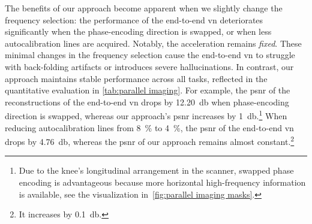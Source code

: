 The benefits of our approach become apparent when we slightly change the frequency selection:
the performance of the end-to-end \gls{vn} deteriorates significantly when the phase-encoding direction is swapped, or when less autocalibration lines are acquired.
Notably, the acceleration remains \emph{fixed}.
These minimal changes in the frequency selection cause the end-to-end \gls{vn} to struggle with back-folding artifacts or introduces severe hallucinations.
In contrast, our approach maintains stable performance across all tasks, reflected in the quantitative evaluation in \cref{tab:parallel imaging}.
For example, the \gls{psnr} of the reconstructions of the end-to-end \gls{vn} drops by \qty{12.20}{\decibel} when phase-encoding direction is swapped, whereas our approach's \gls{psnr} increases by \qty{1}{\decibel}.\footnote{%
	Due to the knee's longitudinal arrangement in the scanner, swapped phase encoding is advantageous because more horizontal high-frequency information is available, see the visualization in~\cref{fig:parallel imaging masks}.
}
When reducing autocalibration lines from \qty{8}{\percent} to \qty{4}{\percent}, the \gls{psnr} of the end-to-end \gls{vn} drops by \qty{4.76}{\decibel}, whereas the \gls{psnr} of our approach remains almost constant.\footnote{It increases by \qty{0.1}{\decibel}.}

